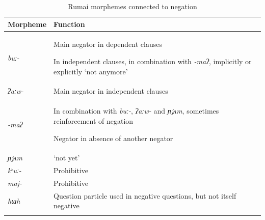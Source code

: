 \documentclass[output=paper,colorlinks,citecolor=brown]{langscibook}
\begin{document}
\begin{table}
\begin{tabularx}{\textwidth}{lX}
\lsptoprule
{Morpheme} & {Function}\\
\midrule
{\itshape buː-} & {Main negator in dependent clauses}

{In independent clauses, in combination with \textit{{}-maʔ}, implicitly or explicitly ‘not anymore’}\\
\tablevspace
{\itshape ʔaːw-} & {Main negator in independent clauses}\\
\tablevspace
{\itshape {}-maʔ} & {In combination with \textit{buː-}, \textit{ʔaːw-} and \textit{ɲjʌm}, sometimes reinforcement of negation}

{Negator in absence of another negator}\\
\tablevspace
{\itshape ɲjʌm} & {‘not yet’}\\
\tablevspace
{\textit{kʰ}\textit{uː-}} & {Prohibitive}\\
\tablevspace
{\itshape maj-} & {Prohibitive}\\
\tablevspace
{\itshape hɯh} &  {Question particle used in negative questions, but not itself negative}\\
\lspbottomrule
\end{tabularx}
\caption{Rumai morphemes connected to negation}
\label{tab:rum:6}
\end{table}
\largerpage[2]
\end{document}
